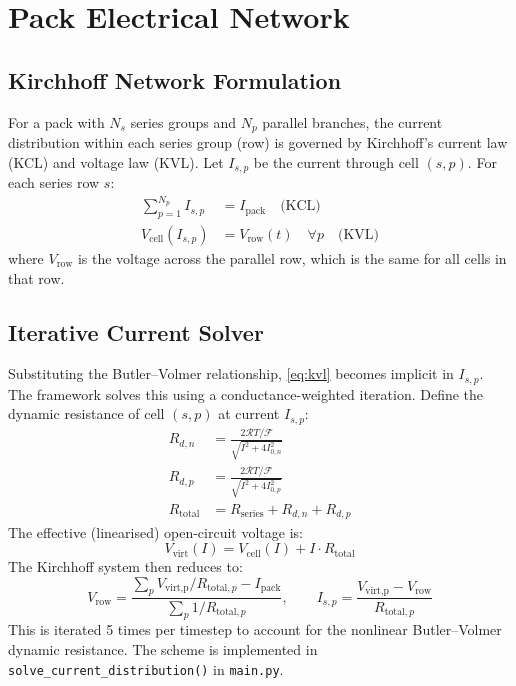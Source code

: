 \section{Pack Electrical Network}
\label{sec:pack_electrical}

\subsection{Kirchhoff Network Formulation}

For a pack with $N_s$ series groups and $N_p$ parallel branches, the current distribution within each series group (row) is governed by Kirchhoff's current law (KCL) and voltage law (KVL). Let $I_{s,p}$ be the current through cell $(s,p)$. For each series row $s$:
\begin{align}
  \sum_{p=1}^{N_p} I_{s,p} &= I_\text{pack} \quad\text{(KCL)} \label{eq:kcl}\\
  V_\text{cell}(I_{s,p}) &= V_\text{row}(t) \quad\forall p \quad\text{(KVL)} \label{eq:kvl}
\end{align}
where $V_\text{row}$ is the voltage across the parallel row, which is the same for all cells in that row.

\subsection{Iterative Current Solver}

Substituting the Butler--Volmer relationship, \cref{eq:kvl} becomes implicit in $I_{s,p}$. The framework solves this using a conductance-weighted iteration. Define the dynamic resistance of cell $(s,p)$ at current $I_{s,p}$:
\begin{align}
  R_{d,n} &= \frac{2\mathcal{R}T/\mathcal{F}}{\sqrt{I^2 + 4I_{0,n}^2}} \label{eq:Rd_n}\\
  R_{d,p} &= \frac{2\mathcal{R}T/\mathcal{F}}{\sqrt{I^2 + 4I_{0,p}^2}} \label{eq:Rd_p}\\
  R_\text{total} &= R_\text{series} + R_{d,n} + R_{d,p} \label{eq:R_total}
\end{align}
The effective (linearised) open-circuit voltage is:
\begin{equation}
  V_\text{virt}(I) = V_\text{cell}(I) + I \cdot R_\text{total}
  \label{eq:V_virtual}
\end{equation}
The Kirchhoff system then reduces to:
\begin{equation}
  V_\text{row} = \frac{\sum_p V_\text{virt,p}/R_{\text{total},p} - I_\text{pack}}{\sum_p 1/R_{\text{total},p}}, \qquad I_{s,p} = \frac{V_\text{virt,p} - V_\text{row}}{R_{\text{total},p}}
  \label{eq:current_dist_solution}
\end{equation}
This is iterated 5 times per timestep to account for the nonlinear Butler--Volmer dynamic resistance. The scheme is implemented in \texttt{solve\_current\_distribution()} in \texttt{main.py}.
